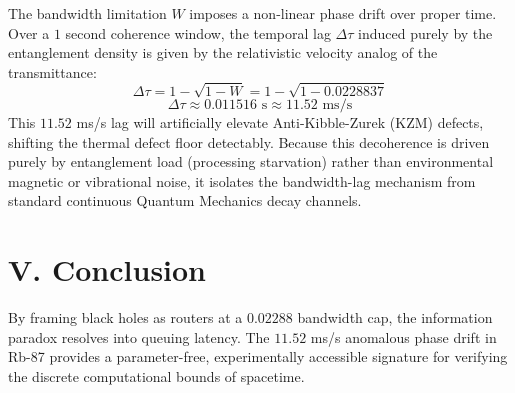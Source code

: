\documentclass[twocolumn,prl,aps,superscriptaddress]{revtex4-2}
\begin{document}
The bandwidth limitation $W$ imposes a non-linear phase drift over proper time. Over a $1$ second coherence window, the temporal lag $\Delta \tau$ induced purely by the entanglement density is given by the relativistic velocity analog of the transmittance:
\begin{equation}
\Delta \tau = 1 - \sqrt{1 - W} = 1 - \sqrt{1 - 0.0228837}
\end{equation}
\begin{equation}
\Delta \tau \approx 0.011516 \text{ s} \approx 11.52 \text{ ms/s}
\end{equation}
This $11.52$ ms/s lag will artificially elevate Anti-Kibble-Zurek (KZM) defects, shifting the thermal defect floor detectably. Because this decoherence is driven purely by entanglement load (processing starvation) rather than environmental magnetic or vibrational noise, it isolates the bandwidth-lag mechanism from standard continuous Quantum Mechanics decay channels.

\section{V. Conclusion}
By framing black holes as routers at a $0.02288$ bandwidth cap, the information paradox resolves into queuing latency. The $11.52$ ms/s anomalous phase drift in Rb-87 provides a parameter-free, experimentally accessible signature for verifying the discrete computational bounds of spacetime.
\end{document}
